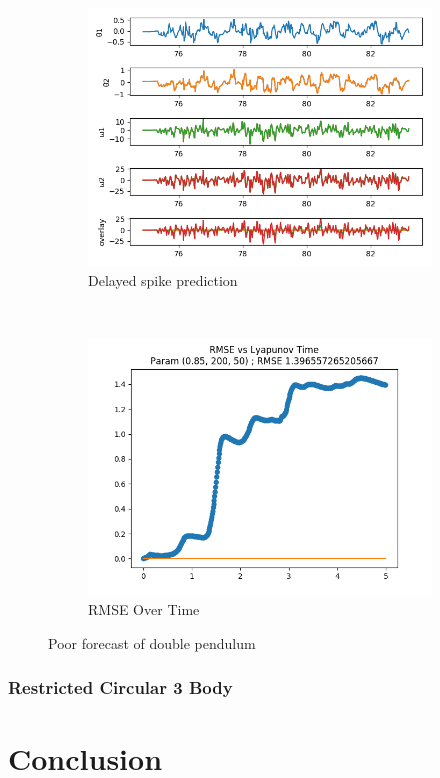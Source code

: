 \documentclass{article}
\begin{document}
\begin{figure}[H]
    \centering
    \begin{subfigure}[b]{0.45\textwidth}
        \includegraphics[width=\textwidth]{doc/paper/images/doub_pend/rank_4_param_127_fit.png}
        \caption{Delayed spike prediction}
    \end{subfigure}
    ~
    \begin{subfigure}[b]{0.45\textwidth}
        \includegraphics[width=\textwidth]{doc/paper/images/lorenz/rank_4_param_300_rmse.png}
        \caption{RMSE Over Time}
    \end{subfigure}
    \caption{Poor forecast of double pendulum}
\end{figure}

\subsubsection{Restricted Circular 3 Body}

\section{Conclusion}



\end{document}
